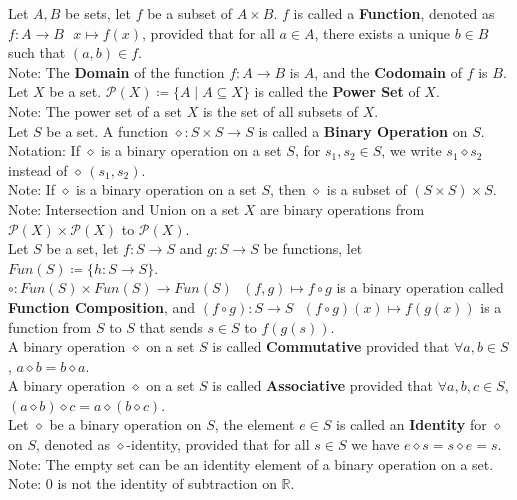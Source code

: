 \documentclass[11pt]{article}
\newcommand{\R}{\mathbb{R}}
\newcommand{\note}{\color{gray}Note: \color{black}}
\newcommand{\notation}{\color{gray}Notation: \color{black}}
\begin{document}
		\noindent Let $A,B$ be sets, let $f$ be a subset of $A \times B$. $f$ is called a \textbf{Function}, denoted as $f:A \to B \ \ \ x \mapsto f(x)$, provided that for all $a \in A$, there exists a unique $b \in B$ such that $(a,b) \in f$.\\
		\note The \textbf{Domain} of the function $f:A \to B$ is $A$, and the \textbf{Codomain} of $f$ is $B$.\\
	
		\noindent Let $X$ be a set. $\mathcal{P}(X) \coloneqq \{A \mid A \subseteq X\}$ is called the \textbf{Power Set} of $X$.\\
		\note The power set of a set $X$ is the set of all subsets of $X$.\\ 
	
		\noindent Let $S$ be a set. A function $\diamond : S \times S \to S$ is called a \textbf{Binary Operation} on $S$.\\
		\notation If $\diamond$ is a binary operation on a set $S$, for $s_1,s_2 \in S$, we write $s_1 \diamond s_2$ instead of $\diamond \, (s_1,s_2)$.\\
		\note If $\diamond$ is a binary operation on a set $S$, then $\diamond$ is a subset of $(S \times S) \times S$.\\
		\note Intersection and Union on a set $X$ are binary operations from $\mathcal{P}(X) \times \mathcal{P}(X)$ to $\mathcal{P}(X)$.\\
	
		\noindent Let $S$ be a set, let $f:S \to S$ and $g: S \to S$ be functions, let $Fun(S)\coloneqq \{h:S \to S\}$.\\ $\circ :Fun(S)\times Fun(S) \to Fun(S) \ \ \ (f,g)\mapsto f \circ g$ is a binary operation called \textbf{Function Composition}, and $(f \circ g): S \to S \ \ \ (f \circ g)(x)\mapsto f(g(x))$ is a function from $S$ to $S$ that sends $s \in S$ to $f(g(s))$.\\
	
		\noindent A binary operation $\diamond$ on a set $S$ is called \textbf{Commutative} provided that $\forall a,b \in S$, ${a \diamond b = b \diamond a}$.\\
	A binary operation $\diamond$ on a set $S$ is called \textbf{Associative} provided that $\forall a,b,c \in S$, ${(a \diamond b) \diamond c=a \diamond (b \diamond c)}$.\\
	
		\noindent Let $\diamond$ be a binary operation on $S$, the element $e \in S$ is called an \textbf{Identity} for $\diamond$ on $S$, denoted as $\diamond$-identity, provided that for all $s \in S$ we have $e \diamond s=s \diamond e = s$.\\
		\note The empty set can be an identity element of a binary operation on a set.\\
		\note 0 is not the identity of subtraction on $\R$.\\
	
\end{document}
